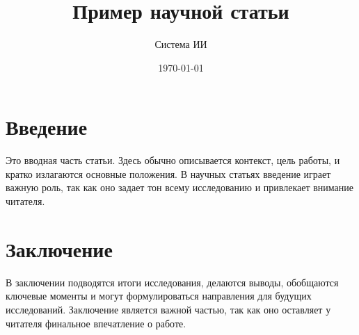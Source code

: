 \documentclass{article}
\title{Пример научной статьи}
\author{Система ИИ}
\date{\today}
\begin{document}
\maketitle

\section{Введение}
Это вводная часть статьи. Здесь обычно описывается контекст, цель работы, и кратко излагаются основные положения. В научных статьях введение играет важную роль, так как оно задает тон всему исследованию и привлекает внимание читателя.

\section{Заключение}
В заключении подводятся итоги исследования, делаются выводы, обобщаются ключевые моменты и могут формулироваться направления для будущих исследований. Заключение является важной частью, так как оно оставляет у читателя финальное впечатление о работе.
\end{document}

